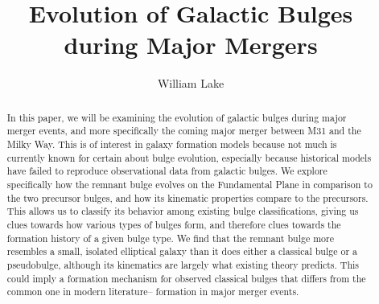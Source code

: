 \documentclass[iop]{emulateapj}
\begin{document}

\title{Evolution of Galactic Bulges during Major Mergers}


\author{William Lake}





\begin{abstract}

In this paper, we will be examining the evolution of galactic bulges during major merger events, and more specifically the coming major merger between M31 and the Milky Way. This is of interest in galaxy formation models because not much is currently known for certain about bulge evolution, especially because historical models have failed to reproduce observational data from galactic bulges. We explore specifically how the remnant bulge evolves on the Fundamental Plane in comparison to the two precursor bulges, and how its kinematic properties compare to the precursors. This allows us to classify its behavior among existing bulge classifications, giving us clues towards how various types of bulges form, and therefore clues towards the formation history of a given bulge type. We find that the remnant bulge more resembles a small, isolated elliptical galaxy than it does either a classical bulge or a pseudobulge, although its kinematics are largely what existing theory predicts. This could imply a formation mechanism for observed classical bulges that differs from the common one in modern literature-- formation in major merger events.

\end{abstract}
\end{document}

